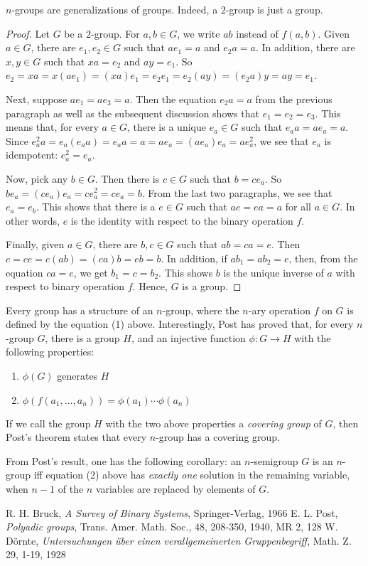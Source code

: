 \documentclass[12pt]{article}
\begin{document}
$n$-groups are generalizations of groups.  Indeed, a $2$-group is just a group.
\begin{proof}  Let $G$ be a $2$-group.  For $a,b\in G$, we write $ab$ instead of $f(a,b)$.  Given $a\in G$, there are $e_1,e_2\in G$ such that $ae_1=a$ and $e_2a=a$.  In addition, there are $x,y\in G$ such that $xa=e_2$ and $ay=e_1$.  So $e_2=xa = x(ae_1)=(xa)e_1= e_2e_1=e_2(ay)=(e_2a)y=ay = e_1$.

Next, suppose $ae_1=ae_3=a$.  Then the equation $e_2a=a$ from the previous paragraph as well as the subsequent discussion shows that $e_1=e_2=e_3$.  This means that, for every $a\in G$, there is a unique $e_a\in G$ such that $e_a a =a e_a =a$.  Since $e_a^2 a = e_a (e_a a)=e_a a = a = a e_a = (a e_a) e_a  = a e_a^2$, we see that $e_a$ is idempotent: $e_a^2=e_a$.

Now, pick any $b\in G$.  Then there is $c\in G$ such that $b=ce_a$.  So $be_a = (c e_a)e_a = c e_a^2= ce_a = b$.  From the last two paragraphs, we see that $e_a = e_b$.  This shows that there is a $e\in G$ such that $ae=ea=a$ for all $a\in G$.  In other words, $e$ is the identity with respect to the binary operation $f$.

Finally, given $a\in G$, there are $b,c\in G$ such that $ab=ca=e$.  Then $c = ce = c(ab)= (ca)b=eb = b$.  In addition, if $ab_1=ab_2=e$, then, from the equation $ca=e$, we get $b_1=c=b_2$.  This shows $b$ is the unique inverse of $a$ with respect to binary operation $f$.  Hence, $G$ is a group.
\end{proof}

Every group has a structure of an $n$-group, where the $n$-ary operation $f$ on $G$ is defined by the equation (1) above.  Interestingly, Post has proved that, for every $n$-group $G$, there is a group $H$, and an injective function $\phi:G\to H$ with the following properties:
\begin{enumerate}
\item $\phi(G)$ generates $H$
\item $\phi(f(a_1,\ldots,a_n))=\phi(a_1)\cdots \phi(a_n)$
\end{enumerate}
If we call the group $H$ with the two above properties a \emph{covering group} of $G$, then Post's theorem states that every $n$-group has a covering group.

From Post's result, one has the following corollary: an $n$-semigroup $G$ is an $n$-group iff equation (2) above has \emph{exactly one} solution in the remaining variable, when $n-1$ of the $n$ variables are replaced by elements of $G$.

\begin{thebibliography}{0}
R. H. Bruck,
{\it A Survey of Binary Systems}, Springer-Verlag, 1966
E. L. Post, 
{\it Polyadic groups}, Trans. Amer. Math. Soc., 48, 208-350, 1940, MR 2, 128
W. D\"{o}rnte, 
{\it Untersuchungen \"{u}ber einen verallgemeinerten Gruppenbegriff}, Math. Z. 29, 1-19, 1928
\end{thebibliography}

\end{document}
